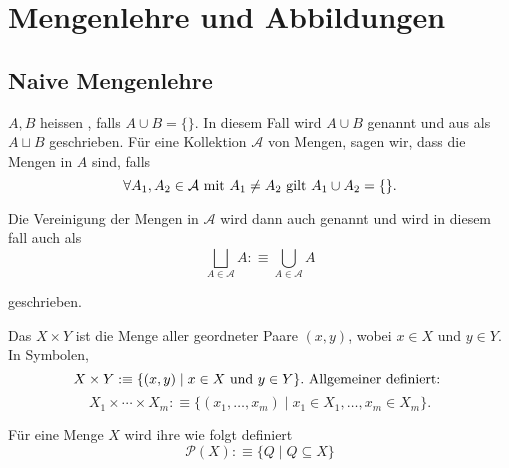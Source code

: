 \section{Mengenlehre und Abbildungen}
\subsection{Naive Mengenlehre}

\begin{mydef}[Disjunktheit]
  
  $A,B$ heissen , falls $A\cup B = \{ \}$. 
  In diesem Fall wird $A\cup B$  genannt und aus als $A \sqcup B$ geschrieben. Für eine Kollektion $\mathcal{A}$ von Mengen, sagen wir, dass die Mengen in $A$  sind, falls
  \begin{equation}
    \forall A_1, A_2 \in \mathcal{A} $ mit $ A_1\neq A_2 $ gilt $ A_1 \cup A_2 = \{ \}.
  \end{equation}
  
  Die Vereinigung der Mengen in $\mathcal{A}$ wird dann auch  genannt und wird in diesem fall auch als 
  \begin{equation}
    \bigsqcup_{A\in\mathcal{A}} A :\equiv \bigcup_{A\in\mathcal{A}} A
  \end{equation}
  
  geschrieben.
\end{mydef}

\begin{mydef}
  Das  $X\times Y$ ist die Menge aller geordneter Paare $(x,y)$, wobei $x\in X$ und $y \in Y$. In Symbolen,
  \begin{equation}
    X \times Y :\equiv \{(x,y) \mid x \in X $ und $ y \in Y \}. $ Allgemeiner definiert: $
  \end{equation}
  \begin{equation}
    X_1 \times \cdots \times X_m :\equiv \{ (x_1, \ldots, x_m) \mid x_1 \in X_1, \ldots, x_m \in X_m \}.
  \end{equation}
\end{mydef}

\begin{mydef} Für eine Menge $X$ wird ihre  wie folgt definiert
  \begin{equation}
    \mathcal{P}(X) :\equiv \{Q \mid Q \subseteq X \}
  \end{equation}
\end{mydef}

